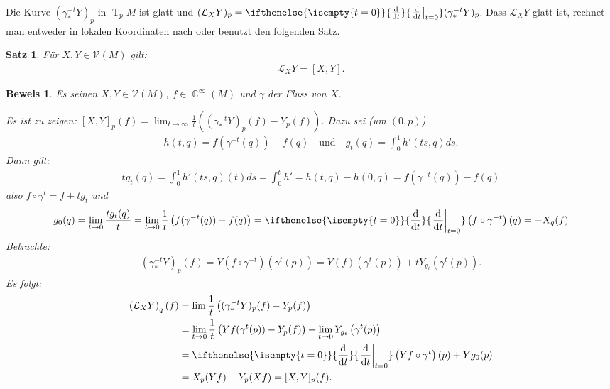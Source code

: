 \documentclass[paper=A4, twoside, chapterprefix=true, bibliography=totoc, headsepline]{scrbook}
\DeclareMathOperator{\C}{\mathbb{C}}
\DeclareMathOperator{\T}{T}         %
\newcommand{\dop}{\mathrm{d}}
\newcommand{\difffrac}[3][]{\ifthenelse{\isempty{#1}}{\frac{\dop #2}{\dop #3}}{\left. \frac{\dop #2}{\dop #3} \right|_{#1}}}
\theoremstyle{plain}
\newtheorem{Satz}[Dfn]{Satz}
\newtheorem{Bem}[Dfn]{Bemerkung}
\theoremstyle{nonumberplain}
\newtheorem{bew}{Beweis}
\theoremstyle{empty}
\theoremstyle{break}
\begin{document}
Die Kurve $(\gamma_{*}^{-t}Y)_p$ in $\T_pM$ ist glatt und $(\mathcal L_XY)_p = \difffrac[t=0]{}{t}(\gamma_{*}^{-t}Y)_p$. Dass $\mathcal L_XY$ glatt ist, rechnet man entweder in lokalen Koordinaten nach oder benutzt den folgenden Satz.

\begin{Satz}
  F\"ur $X,Y \in \mathcal V(M)$ gilt:
  \begin{align*}
    \mathcal L_XY = [X,Y].
  \end{align*}
\end{Satz}

\begin{bew}
Es seinen $X,Y \in \mathcal V(M)$, $f \in \C^{\infty}(M)$ und $\gamma$ der Fluss von $X$.

Es ist zu zeigen: $[X,Y]_p(f) = \lim_{t \to \infty} \frac{1}{t}\left((\gamma_{*}^{-t}Y)_p(f)-Y_p(f)\right)$.
Dazu sei (um $(0,p)$)
\begin{align*}
  h(t,q) = f(\gamma^{-t}(q))-f(q) \quad \text{und} \quad g_t(q) = \int_0^1 h'(ts,q)ds.
\end{align*}
Dann gilt:
\begin{align*}
  tg_t(q) = \int_0^1h'(ts,q)(t)ds = \int_0^th' = h(t,q) - h(0,q) = f(\gamma^{-t}(q)) - f(q)
\end{align*}
also $f \circ \gamma^t = f + tg_t$ und 
\begin{align*}
  g_0(q) = \lim_{t \to 0} \frac{tg_t(q)}{t} = \lim_{t \to 0}\frac{1}t\left(f(\gamma^{-t}(q))-f(q)\right) = \difffrac[t=0]{}{t}\left(f \circ \gamma^{-t}\right)(q) = -X_q(f)
\end{align*}
Betrachte:
\begin{align*}
  \left(\gamma_{*}^{-t}Y\right)_p(f) = Y\left(f \circ \gamma^{-t}\right)\left(\gamma^t(p)\right) = Y(f)\left(\gamma^t(p)\right) + tY_{g_t}\left(\gamma^t(p)\right).
\end{align*}
Es folgt:
\begin{align*}
  \left(\mathcal L_XY\right)_q(f) & = \lim \frac{1}t \left((\gamma_{*}^{-t}Y)_p(f) - Y_p(f)\right)\\
& = \lim_{t\to 0} \frac{1}t \left(Yf(\gamma^t(p))-Y_p(f)\right) + \lim_{t\to 0} Y_{g_t}\left(\gamma^t(p)\right)\\
& = \difffrac[t=0]{}{t}\left(Yf \circ \gamma^t\right)(p) + Yg_0(p)\\
& = X_p(Y f) - Y_p(Xf) = [X,Y]_p(f).
\end{align*} 
\end{bew}
\end{document}
